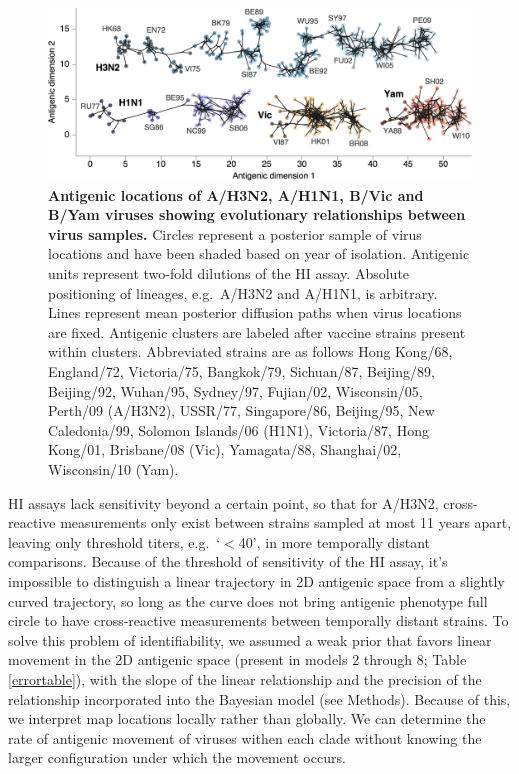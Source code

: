 \documentclass[11pt,oneside,letterpaper]{article}
\begin{document}
\begin{figure}[h]
	\centering		
	\includegraphics[width=1.0\textwidth]{figures/map}
	\caption{\textbf{Antigenic locations of A/H3N2, A/H1N1, B/Vic and B/Yam viruses showing evolutionary relationships between virus samples.} 
	Circles represent a posterior sample of virus locations and have been shaded based on year of isolation.
	Antigenic units represent two-fold dilutions of the HI assay.
	Absolute positioning of lineages, e.g.\ A/H3N2 and A/H1N1, is arbitrary.
	Lines represent mean posterior diffusion paths when virus locations are fixed.
	Antigenic clusters are labeled after vaccine strains present within clusters.
	Abbreviated strains are as follows Hong Kong/68, England/72, Victoria/75, Bangkok/79, Sichuan/87, Beijing/89, Beijing/92, Wuhan/95, Sydney/97, Fujian/02, Wisconsin/05, Perth/09 (A/H3N2), USSR/77, Singapore/86, Beijing/95, New Caledonia/99, Solomon Islands/06 (H1N1), Victoria/87, Hong Kong/01, Brisbane/08 (Vic), Yamagata/88, Shanghai/02, Wisconsin/10 (Yam).} 
	\label{map} 
\end{figure}

HI assays lack sensitivity beyond a certain point, so that for A/H3N2, cross-reactive measurements only exist between strains sampled at most 11 years apart, leaving only threshold titers, e.g.\ `$<$40', in more temporally distant comparisons.  
Because of the threshold of sensitivity of the HI assay, it's impossible to distinguish a linear trajectory in 2D antigenic space from a slightly curved trajectory, so long as the curve does not bring antigenic phenotype full circle to have cross-reactive measurements between temporally distant strains.
To solve this problem of identifiability, we assumed a weak prior that favors linear movement in the 2D antigenic space (present in models 2 through 8; Table \ref{errortable}), with the slope of the linear relationship and the precision of the relationship incorporated into the Bayesian model (see Methods).
Because of this, we interpret map locations locally rather than globally.
We can determine the rate of antigenic movement of viruses withen each clade without knowing the larger configuration under which the movement occurs.
 
\end{document}
